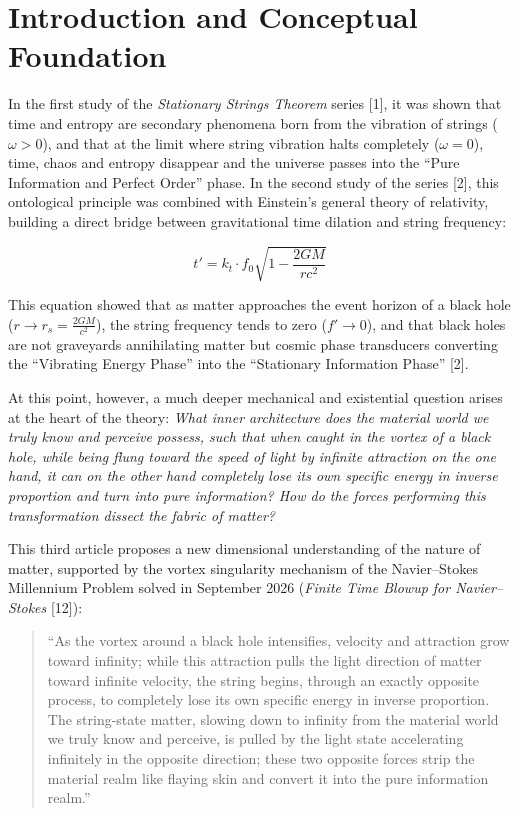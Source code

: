 \documentclass[12pt,a4paper]{article}
\begin{document}
\section{Introduction and Conceptual Foundation}

In the first study of the \textit{Stationary Strings Theorem} series [1], it was shown that time and entropy are secondary phenomena born from the vibration of strings ($\omega > 0$), and that at the limit where string vibration halts completely ($\omega = 0$), time, chaos and entropy disappear and the universe passes into the ``Pure Information and Perfect Order'' phase. In the second study of the series [2], this ontological principle was combined with Einstein's general theory of relativity, building a direct bridge between gravitational time dilation and string frequency:

\begin{equation}
t' = k_t \cdot f_0 \sqrt{1 - \frac{2GM}{rc^2}}
\end{equation}

This equation showed that as matter approaches the event horizon of a black hole ($r \to r_s = \frac{2GM}{c^2}$), the string frequency tends to zero ($f' \to 0$), and that black holes are not graveyards annihilating matter but cosmic phase transducers converting the ``Vibrating Energy Phase'' into the ``Stationary Information Phase'' [2].

At this point, however, a much deeper mechanical and existential question arises at the heart of the theory: \textit{What inner architecture does the material world we truly know and perceive possess, such that when caught in the vortex of a black hole, while being flung toward the speed of light by infinite attraction on the one hand, it can on the other hand completely lose its own specific energy in inverse proportion and turn into pure information? How do the forces performing this transformation dissect the fabric of matter?}

This third article proposes a new dimensional understanding of the nature of matter, supported by the vortex singularity mechanism of the Navier--Stokes Millennium Problem solved in September 2026 (\textit{Finite Time Blowup for Navier--Stokes} [12]):
\begin{quote}
``As the vortex around a black hole intensifies, velocity and attraction grow toward infinity; while this attraction pulls the light direction of matter toward infinite velocity, the string begins, through an exactly opposite process, to completely lose its own specific energy in inverse proportion. The string-state matter, slowing down to infinity from the material world we truly know and perceive, is pulled by the light state accelerating infinitely in the opposite direction; these two opposite forces strip the material realm like flaying skin and convert it into the pure information realm.''
\end{quote}
\end{document}
